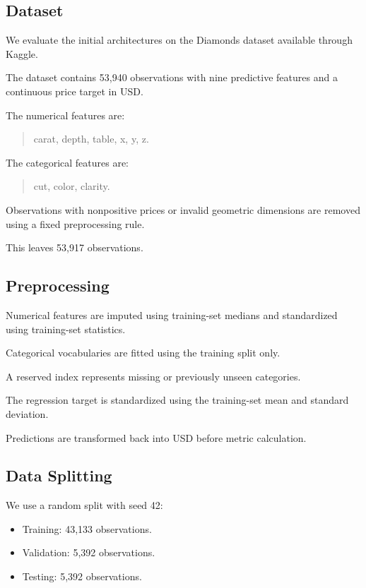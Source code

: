 \documentclass[11pt,a4paper]{article}
\begin{document}
\subsection{Dataset}

We evaluate the initial architectures
on the Diamonds dataset available
through Kaggle.

The dataset contains 53,940 observations
with nine predictive features and a
continuous price target in USD.

The numerical features are:

\begin{quote}
carat, depth, table, x, y, z.
\end{quote}

The categorical features are:

\begin{quote}
cut, color, clarity.
\end{quote}

Observations with nonpositive prices
or invalid geometric dimensions are
removed using a fixed preprocessing rule.

This leaves 53,917 observations.

\subsection{Preprocessing}

Numerical features are imputed using
training-set medians and standardized
using training-set statistics.

Categorical vocabularies are fitted
using the training split only.

A reserved index represents missing
or previously unseen categories.

The regression target is standardized
using the training-set mean and
standard deviation.

Predictions are transformed back into
USD before metric calculation.

\subsection{Data Splitting}

We use a random split with seed 42:

\begin{itemize}
    \item Training: 43,133 observations.
    \item Validation: 5,392 observations.
    \item Testing: 5,392 observations.
\end{itemize}
\end{document}
